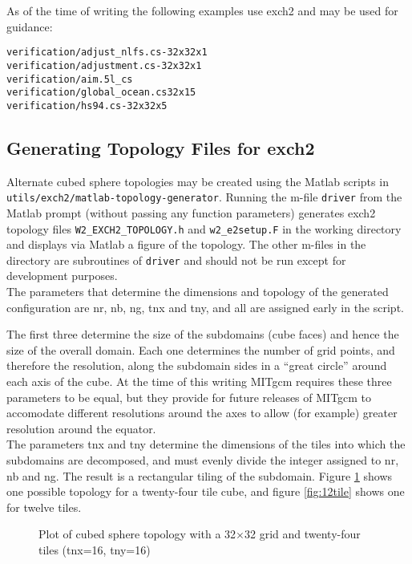 As of the time of writing the following examples use exch2 and may be
used for guidance:

\begin{verbatim}
verification/adjust_nlfs.cs-32x32x1
verification/adjustment.cs-32x32x1 
verification/aim.5l_cs
verification/global_ocean.cs32x15
verification/hs94.cs-32x32x5
\end{verbatim}




\subsection{Generating Topology Files for exch2}
\label{sec:topogen}

Alternate cubed sphere topologies may be created using the Matlab
scripts in \texttt{utils/exch2/matlab-topology-generator}. Running the
m-file \texttt{driver} from the Matlab prompt (without passing any
function parameters) generates exch2 topology files
\texttt{W2\_EXCH2\_TOPOLOGY.h} and \texttt{w2\_e2setup.F} in the
working directory and displays via Matlab a figure of the topology.
The other m-files in the directory are subroutines of \texttt{driver}
and should not be run except for development purposes. \\

The parameters that determine the dimensions and topology of the
generated configuration are nr, nb, ng, tnx and tny, and all are
assigned early in the script.

The first three determine the size of the subdomains (cube faces) and
hence the size of the overall domain.  Each one determines the number
of grid points, and therefore the resolution, along the subdomain
sides in a ``great circle'' around each axis of the cube.  At the time
of this writing MITgcm requires these three parameters to be equal,
but they provide for future releases of MITgcm to accomodate different
resolutions around the axes to allow (for example) greater resolution
around the equator.\\

The parameters tnx and tny determine the dimensions of the tiles into
which the subdomains are decomposed, and must evenly divide the
integer assigned to nr, nb and ng.  The result is a rectangular tiling
of the subdomain.  Figure \ref{fig:24tile} shows one possible topology
for a twenty-four tile cube, and figure \ref{fig:12tile} shows one for
twelve tiles. \\

\begin{figure}
\begin{center}
\end{center} 
\caption{Plot of cubed sphere topology with a 32$\times$32 grid and
twenty-four tiles (tnx=16, tny=16)
} \label{fig:24tile}
\end{figure}

